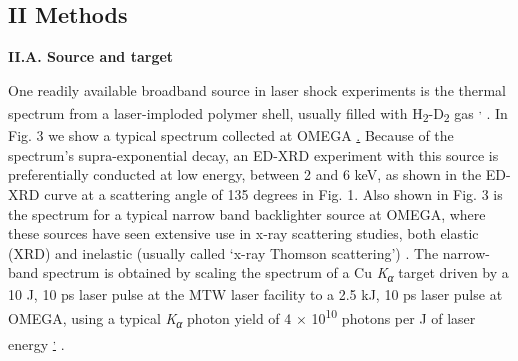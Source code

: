 \subsection{II Methods}\label{ii-methods}

\textbf{II.A. Source and target}

One readily available broadband source in laser shock experiments is the
thermal spectrum from a laser-imploded polymer shell, usually filled
with H\textsubscript{2}-D\textsubscript{2} gas
\hyperref[b.-r.-maddox-et-al.-physics-of-plasmas-18-056709-2011.]\cite{MADDOX2011ABSOLUTE}\textsuperscript{,}
\hyperref[b.-yaakobi-f.-j.-marshall-t.-r.-boehly-r.-p.-j.-town-and-d.-d.-meyerhofer-journal-of-the-optical-society-of-america-b-optical-physics-20-238-2003.]\cite{YAAKOBI2003EXTENDED}.
In Fig. 3 we show a typical spectrum collected at OMEGA
\hyperref[b.-yaakobi-2012-private-communication.].
Because of the spectrum's supra-exponential decay, an ED-XRD experiment
with this source is preferentially conducted at low energy, between 2
and 6 keV, as shown in the ED-XRD curve at a scattering angle of 135
degrees in Fig. 1. Also shown in Fig. 3 is the spectrum for a typical
narrow band backlighter source at OMEGA, where these sources have seen
extensive use in x-ray scattering studies, both elastic (XRD)
\hyperref[t.-ma-et-al.-physical-review-letters-110-065001-2013.]\cite{MA2013X}
and inelastic (usually called `x-ray Thomson scattering')
\hyperref[s.-h.-glenzer-and-r.-redmer-reviews-of-modern-physics-81-1625-2009.]\cite{GLENZER2009X}.
The narrow-band spectrum is obtained by scaling the spectrum of a Cu
\emph{K\textsubscript{α}} target driven by a 10 J, 10 ps laser pulse at
the MTW laser facility to a 2.5 kJ, 10 ps laser pulse at OMEGA, using a
typical \emph{K\textsubscript{α}} photon yield of 4 ×
10\textsuperscript{10} photons per J of laser energy
\hyperref[p.-m.-nilson-2012-private-communication.]\textsuperscript{,}
\hyperref[k.-u.-akli-et-al.-physics-of-plasmas-14-023102-2007.]\cite{AKLI2007TEMPERATURE}.

